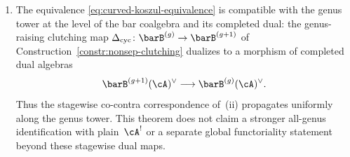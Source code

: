 \begin{theorem}
\begin{enumerate}[label=\textup{(\roman*)}]
\item The equivalence \eqref{eq:curved-koszul-equivalence} is
 compatible with the genus tower at the level of the bar coalgebra
 and its completed dual: the genus-raising clutching map
 $\Delta_{\mathrm{cyc}}\colon \barB^{(g)} \to \barB^{(g+1)}$
 of Construction~\textup{\ref{constr:nonsep-clutching}} dualizes to
 a morphism of completed dual algebras
 \[
 \barB^{(g+1)}(\cA)^\vee \longrightarrow \barB^{(g)}(\cA)^\vee.
 \]
 Thus the stagewise co-contra correspondence of~\textup{(}ii\textup{)}
 propagates uniformly along the genus tower.
 This theorem does not claim a stronger all-genus identification
 with plain~$\cA^!$ or a separate global functoriality statement
 beyond these stagewise dual maps.
\end{enumerate}
\end{theorem}

